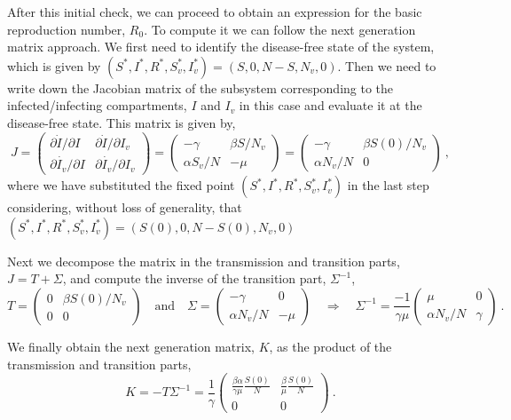After this initial check, we can proceed to obtain an expression for the basic
reproduction number, $R_0$. To compute it we can follow the next generation
matrix approach. We first need to identify the disease-free state of the
system, which is given by $(S^*,I^*,R^*,S_v^*,I_v^*)=(S,0,N-S,N_v,0)$.
Then we need to write down the Jacobian matrix of the subsystem corresponding
to the infected/infecting compartments, $I$ and $I_v$ in this case and evaluate
it at the disease-free state. This matrix is given by,
\begin{equation}
  J=\begin{pmatrix}
    \partial \dot{I}/\partial I   & \partial \dot{I}/\partial I_v   \\
    \partial \dot{I_v}/\partial I & \partial \dot{I_v}/\partial I_v
  \end{pmatrix}=
  \begin{pmatrix}
    -\gamma      & \beta S/N_v \\
    \alpha S_v/N & -\mu
  \end{pmatrix}=
  \begin{pmatrix}
    -\gamma      & \beta S(0)/N_v \\
    \alpha N_v/N & 0
  \end{pmatrix} \ ,
\end{equation}
where we have substituted the fixed point $(S^*,I^*,R^*,S_v^*,I_v^*)$ in the
last step considering, without loss of generality, that
$(S^*,I^*,R^*,S_v^*,I_v^*)=(S(0),0,N-S(0),N_v,0)$

Next we decompose the matrix in the transmission and transition parts,
$J=T+\Sigma$, and compute the inverse of the transition part, $\Sigma^{-1}$,
\begin{equation}
  T=\begin{pmatrix}
    0 & \beta S(0)/N_v \\
    0 & 0
  \end{pmatrix} \quad \text{and} \quad
  \Sigma=\begin{pmatrix}
    -\gamma      & 0    \\
    \alpha N_v/N & -\mu
  \end{pmatrix} \quad \Longrightarrow \quad
  \Sigma^{-1}=\frac{-1}{\gamma\mu}\begin{pmatrix}
    \mu          & 0      \\
    \alpha N_v/N & \gamma
  \end{pmatrix} \ .
\end{equation}

We finally obtain the next generation matrix, $K$, as the product of the
transmission and transition parts,
\begin{equation}
  K=-T\Sigma^{-1}=\frac{1}{\gamma}\begin{pmatrix}
    \frac{\beta\alpha}{\gamma\mu}\frac{S(0)}{N} &
    \frac{\beta}{\mu}\frac{S(0)}{N}                 \\
    0                                           & 0
  \end{pmatrix} \ .
\end{equation}

